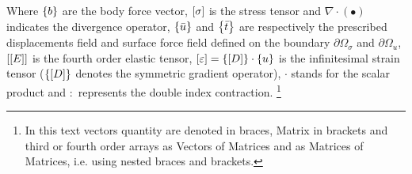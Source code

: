 Where $\left\lbrace{b}\right \rbrace$ are the body force vector, $\left[{\sigma}\right]$ is the stress tensor and $\nabla \cdot (\bullet)$ indicates the divergence operator, $\left\lbrace{\bar{u}}\right \rbrace$ and $\left\lbrace{\bar{t}}\right \rbrace$ are respectively the prescribed displacements field and surface force field defined on the boundary $ \partial \Omega_{\sigma}$ and $ \partial \Omega_{u}$, $\left[{\left[{E}\right]}\right]$ is the fourth order elastic tensor, $\left[{\varepsilon}\right] = \left\lbrace{\ensuremath\left[{D}\right]}\right \rbrace \cdot\left\lbrace{u}\right \rbrace $ is the infinitesimal strain tensor ($\left\lbrace{\ensuremath\left[{D}\right]}\right \rbrace$ denotes the symmetric gradient operator), $\cdot$ stands for the scalar product and $:$ represents the double index contraction. \footnote{In this text vectors quantity are denoted in braces, Matrix in brackets and third or fourth order arrays as Vectors of Matrices and as Matrices of Matrices, i.e. using nested braces and brackets.}\\

